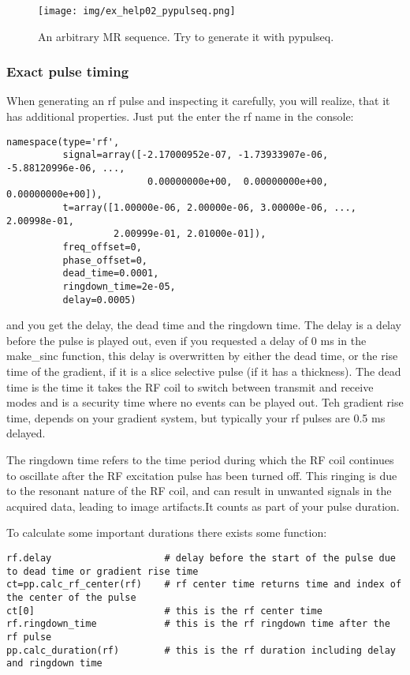 \documentclass[a4paper,12pt]{extarticle}
\begin{document}
\begin{figure}[H] 
\centering
\texttt{[image: img/ex\_help02\_pypulseq.png]}
\caption{An arbitrary MR sequence. Try to generate it with pypulseq.} \label{fig:ex_help02}
\end{figure}


\subsubsection{Exact pulse timing}
When generating an rf pulse and inspecting it carefully, you will realize, that it has additional properties.
Just put the enter the rf name in the console:
\begin{verbatim}
namespace(type='rf',
          signal=array([-2.17000952e-07, -1.73933907e-06, -5.88120996e-06, ...,
                         0.00000000e+00,  0.00000000e+00,  0.00000000e+00]),
          t=array([1.00000e-06, 2.00000e-06, 3.00000e-06, ..., 2.00998e-01,
                   2.00999e-01, 2.01000e-01]),
          freq_offset=0,
          phase_offset=0,
          dead_time=0.0001,
          ringdown_time=2e-05,
          delay=0.0005)
\end{verbatim}
and you get the delay, the dead time and the ringdown time.
The delay is a delay before the pulse is played out, even if you requested a delay of 0 ms in the make\_sinc function, this delay is overwritten by either the dead time, or the rise time of the gradient, if it is a slice selective pulse (if it has a thickness).  The dead time is the time it takes the RF coil to switch between transmit and receive modes and is a security time where no events can be played out. Teh gradient rise time, depends on your gradient system, but typically your rf pulses are 0.5 ms delayed. 

The ringdown time refers to the time period during which the RF coil continues to oscillate after the RF excitation pulse has been turned off. This ringing is due to the resonant nature of the RF coil, and can result in unwanted signals in the acquired data, leading to image artifacts.It counts as part of your pulse duration. 

To calculate some important durations there exists some function:
\begin{verbatim}
rf.delay                    # delay before the start of the pulse due to dead time or gradient rise time
ct=pp.calc_rf_center(rf)    # rf center time returns time and index of the center of the pulse
ct[0]                       # this is the rf center time
rf.ringdown_time            # this is the rf ringdown time after the rf pulse
pp.calc_duration(rf)        # this is the rf duration including delay and ringdown time
\end{verbatim}
\end{document}
